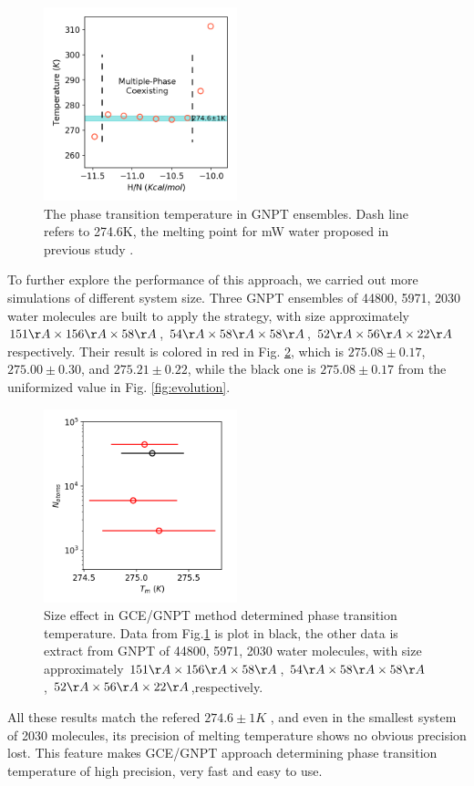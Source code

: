 \documentclass[aps,prl,twocolumn,superscriptaddress]{revtex4-1}
\begin{document}
\begin{figure}[ht]
\centering{}\includegraphics[width=0.5\textwidth]{PTtemp-mw.png} 
\caption{The phase transition temperature in GNPT ensembles. Dash line refers to 274.6K, the melting point for mW water proposed in previous study \cite{Molinero2009} . 
\label{fig:PTtemp-mw}} 
\end{figure}

To further explore the performance of this approach, we carried out more simulations of different system size. Three GNPT ensembles of 44800, 5971, 2030 water molecules are built  to apply the strategy, with size approximately $151\AA \times  156 \AA \times  58 \AA$, $54 \AA \times  58 \AA \times  58 \AA$, $52\AA \times  56 \AA \times  22\AA$ respectively.  Their result is colored in red in Fig. \ref{fig:sizeeffect},  which is $275.08\pm 0.17$, $275.00\pm 0.30$, and $275.21\pm 0.22$, while the black one is $275.08\pm 0.17$  from the uniformized value in Fig. \ref{fig:evolution}.

\begin{figure}[ht]
\centering{}\includegraphics[width=0.5\textwidth]{size_effect.png} 
\caption{Size effect in GCE/GNPT method determined phase transition temperature. Data from Fig.\ref{fig:PTtemp-mw} is plot in black, the other data is extract from GNPT of 44800, 5971, 2030 water molecules, with size approximately $151\AA \times  156 \AA \times  58 \AA$, $54 \AA \times  58 \AA \times  58 \AA$, $52\AA \times  56 \AA \times  22\AA$,respectively.
\label{fig:sizeeffect}} 
\end{figure}
All these results match the refered $274.6\pm 1K$ , and even in the smallest system of 2030 molecules, its precision of melting temperature shows no obvious precision lost. This feature makes GCE/GNPT approach determining phase transition temperature of high precision, very fast and easy to use.
\end{document}
